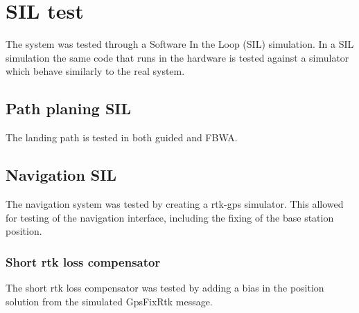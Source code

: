 \chapter{SIL test}
The system was tested through a Software In the Loop (SIL) simulation. In a SIL simulation the same code that runs in the hardware is tested against a simulator which behave similarly to the real system.

\section{Path planing SIL}
The landing path is tested in both guided and FBWA. 
\section{Navigation SIL}
The navigation system was tested by creating a \gls{rtk-gps} simulator. This allowed for testing of the navigation interface, including the fixing of the base station position.

\subsection{Short rtk loss compensator}
The short rtk loss compensator was tested by adding a bias in the position solution from the simulated GpsFixRtk message. 